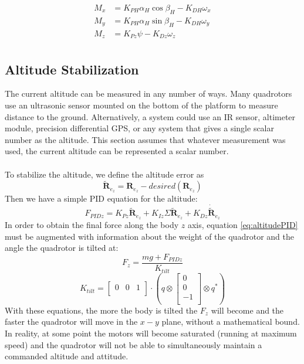 \documentclass{article}
\numberwithin{equation}{section} %
\newcommand{\bs}[1]{\boldsymbol{#1}}
\begin{document}
\begin{align}
	M_x &= K_{PH} \alpha_H \cos \beta_H - K_{DH} \omega_x \\
	M_y &= K_{PH} \alpha_H \sin \beta_H - K_{DH} \omega_y \\
	M_z &= K_{Pz} \psi - K_{Dz} \omega_z \\
\end{align}



\subsection{Altitude Stabilization} \label{subsec:altitudestabilization}
The current altitude can be measured in any number of ways. Many quadrotors use an ultrasonic sensor mounted on the bottom of the platform to measure distance to the ground. Alternatively, a system could use an IR sensor, altimeter module, precision differential GPS, or any system that gives a single scalar number as the altitude. This section assumes that whatever measurement was used, the current altitude can be represented a scalar number.
\\ \\
To stabilize the altitude, we define the altitude error as
\begin{equation}
\tilde{\bs{R}}_{e_z} = \bs{R}_{e_z} - desired \left( \bs{R}_{e_z} \right)
\end{equation}
Then we have a simple PID equation for the altitude:
\begin{equation} \label{eq:altitudePID}
	F_{PIDz} = K_{Pz} \tilde{\bs{R}}_{e_z} + K_{Iz} \Sigma \tilde{\bs{R}}_{e_z} + K_{Dz} \dot{\tilde{\bs{R}}}_{e_z}
\end{equation}
In order to obtain the final force along the body $z$ axis, equation \eqref{eq:altitudePID} must be augmented with information about the weight of the quadrotor and the angle the quadrotor is tilted at:
\begin{equation}
	F_z = \frac{mg + F_{PIDz}} {K_{tilt}}
\end{equation}
\begin{equation}
	K_{tilt} = 
	\begin{bmatrix}
		0 & 0 & 1 \\	
	\end{bmatrix}
	\cdot
	\left(
		q \otimes
			\begin{bmatrix}
				0 \\
				0 \\
				-1 \\
			\end{bmatrix}
		\otimes q^*
	\right)
\end{equation}
With these equations, the more the body is tilted the $F_z$ will become and the faster the quadrotor will move in the $x-y$ plane, without a mathematical bound. In reality, at some point the motors will become saturated (running at maximum speed) and the quadrotor will not be able to simultaneously maintain a commanded altitude and attitude.
\end{document}
